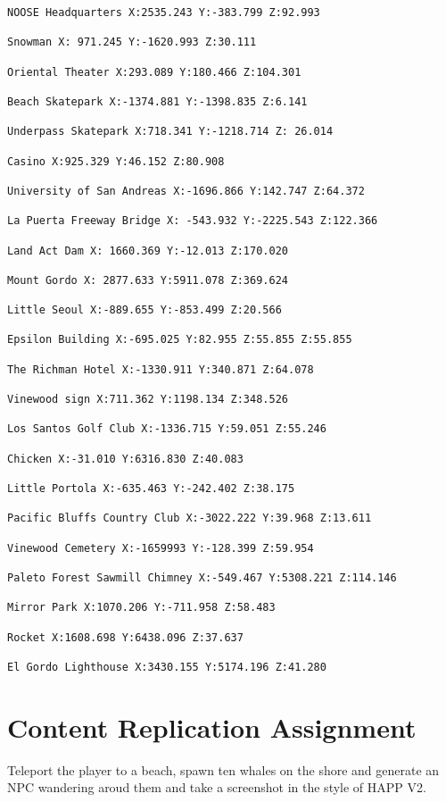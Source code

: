 \documentclass[
  openany]{book}
\begin{document}
\begin{verbatim}
NOOSE Headquarters X:2535.243 Y:-383.799 Z:92.993

Snowman X: 971.245 Y:-1620.993 Z:30.111

Oriental Theater X:293.089 Y:180.466 Z:104.301

Beach Skatepark X:-1374.881 Y:-1398.835 Z:6.141

Underpass Skatepark X:718.341 Y:-1218.714 Z: 26.014

Casino X:925.329 Y:46.152 Z:80.908

University of San Andreas X:-1696.866 Y:142.747 Z:64.372

La Puerta Freeway Bridge X: -543.932 Y:-2225.543 Z:122.366

Land Act Dam X: 1660.369 Y:-12.013 Z:170.020

Mount Gordo X: 2877.633 Y:5911.078 Z:369.624

Little Seoul X:-889.655 Y:-853.499 Z:20.566

Epsilon Building X:-695.025 Y:82.955 Z:55.855 Z:55.855

The Richman Hotel X:-1330.911 Y:340.871 Z:64.078

Vinewood sign X:711.362 Y:1198.134 Z:348.526

Los Santos Golf Club X:-1336.715 Y:59.051 Z:55.246

Chicken X:-31.010 Y:6316.830 Z:40.083

Little Portola X:-635.463 Y:-242.402 Z:38.175

Pacific Bluffs Country Club X:-3022.222 Y:39.968 Z:13.611

Vinewood Cemetery X:-1659993 Y:-128.399 Z:59.954

Paleto Forest Sawmill Chimney X:-549.467 Y:5308.221 Z:114.146

Mirror Park X:1070.206 Y:-711.958 Z:58.483

Rocket X:1608.698 Y:6438.096 Z:37.637

El Gordo Lighthouse X:3430.155 Y:5174.196 Z:41.280
\end{verbatim}

\hypertarget{content-replication-assignment-4}{%
\section*{Content Replication Assignment}\label{content-replication-assignment-4}}

Teleport the player to a beach, spawn ten whales on the shore and generate an NPC wandering aroud them and take a screenshot in the style of HAPP V2.
\end{document}
